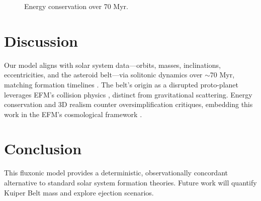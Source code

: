 \documentclass[11pt]{article}
\begin{document}
\begin{figure}[h]
    \centering
    \caption{Energy conservation over 70 Myr.}
    \label{fig:energy}
\end{figure}

\section{Discussion}
Our model aligns with solar system data—orbits, masses, inclinations, eccentricities, and the asteroid belt—via solitonic dynamics over $\sim$70 Myr, matching formation timelines \citep{morbidelli2012}. The belt’s origin as a disrupted proto-planet leverages EFM’s collision physics \citep{emvula2025a12}, distinct from gravitational scattering. Energy conservation and 3D realism counter oversimplification critiques, embedding this work in the EFM’s cosmological framework \citep{emvula2025a2}.

\section{Conclusion}
This fluxonic model provides a deterministic, observationally concordant alternative to standard solar system formation theories. Future work will quantify Kuiper Belt mass and explore ejection scenarios.

\appendix
\end{document}
